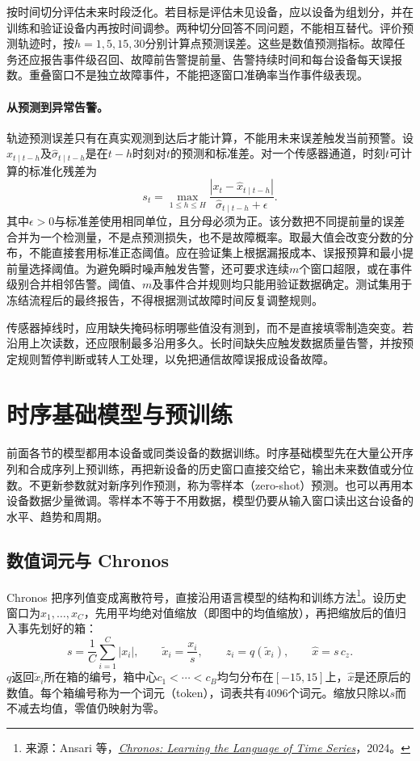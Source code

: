 按时间切分评估未来时段泛化。若目标是评估未见设备，应以设备为组划分，并在训练和验证设备内再按时间调参。两种切分回答不同问题，不能相互替代。评价预测轨迹时，按$h=1,5,15,30$分别计算点预测误差。这些是数值预测指标。故障任务还应报告事件级召回、故障前告警提前量、告警持续时间和每台设备每天误报数。重叠窗口不是独立故障事件，不能把逐窗口准确率当作事件级表现。

\paragraph{从预测到异常告警。}
轨迹预测误差只有在真实观测到达后才能计算，不能用未来误差触发当前预警。设$\hat x_{t\mid t-h}$及$\hat\sigma_{t\mid t-h}$是在$t-h$时刻对$t$的预测和标准差。对一个传感器通道，时刻$t$可计算的标准化残差为
\begin{equation}
 s_t=\max_{1\leq h\leq H}\frac{|x_t-\hat x_{t\mid t-h}|}{\hat\sigma_{t\mid t-h}+\epsilon}.
\end{equation}
其中$\epsilon>0$与标准差使用相同单位，且分母必须为正。该分数把不同提前量的误差合并为一个检测量，不是点预测损失，也不是故障概率。取最大值会改变分数的分布，不能直接套用标准正态阈值。应在验证集上根据漏报成本、误报预算和最小提前量选择阈值。为避免瞬时噪声触发告警，还可要求连续$m$个窗口超限，或在事件级别合并相邻告警。阈值、$m$及事件合并规则均只能用验证数据确定。测试集用于冻结流程后的最终报告，不得根据测试故障时间反复调整规则。

传感器掉线时，应用缺失掩码标明哪些值没有测到，而不是直接填零制造突变。若沿用上次读数，还应限制最多沿用多久。长时间缺失应触发数据质量告警，并按预定规则暂停判断或转人工处理，以免把通信故障误报成设备故障。

\section{时序基础模型与预训练}
\label{sec:sequence-foundation}
前面各节的模型都用本设备或同类设备的数据训练。时序基础模型先在大量公开序列和合成序列上预训练，再把新设备的历史窗口直接交给它，输出未来数值或分位数。不更新参数就对新序列作预测，称为零样本（zero-shot）预测。也可以再用本设备数据少量微调。零样本不等于不用数据，模型仍要从输入窗口读出这台设备的水平、趋势和周期。

\subsection{数值词元与 Chronos}
Chronos 把序列值变成离散符号，直接沿用语言模型的结构和训练方法\footnote{来源：Ansari 等，\href{https://arxiv.org/abs/2403.07815}{\textit{Chronos: Learning the Language of Time Series}}，2024。}。设历史窗口为$x_1,\ldots,x_C$，先用平均绝对值缩放（即图中的均值缩放），再把缩放后的值归入事先划好的箱：
\begin{equation}
 s=\frac1C\sum_{i=1}^{C}|x_i|,\qquad \tilde x_i=\frac{x_i}{s},\qquad
 z_i=q(\tilde x_i),\qquad \hat x=s\,c_{z}.
 \label{eq:sequence-chronos-token}
\end{equation}
$q$返回$\tilde x_i$所在箱的编号，箱中心$c_1<\cdots<c_B$均匀分布在$[-15,15]$上，$\hat x$是还原后的数值。每个箱编号称为一个词元（token），词表共有4096个词元。缩放只除以$s$而不减去均值，零值仍映射为零。

